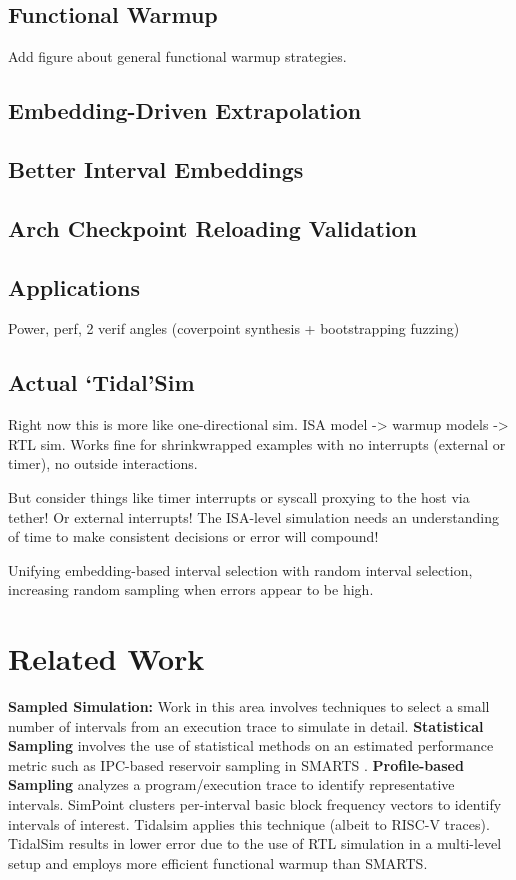 \documentclass[sigplan,nonacm,10pt]{acmart}
\begin{document}
\subsection{Functional Warmup}

Add figure about general functional warmup strategies.

\subsection{Embedding-Driven Extrapolation}

\subsection{Better Interval Embeddings}

\subsection{Arch Checkpoint Reloading Validation}

\subsection{Applications}

Power, perf, 2 verif angles (coverpoint synthesis + bootstrapping fuzzing)

\subsection{Actual `Tidal'Sim}

Right now this is more like one-directional sim. ISA model -> warmup models -> RTL sim.
Works fine for shrinkwrapped examples with no interrupts (external or timer), no outside interactions.

But consider things like timer interrupts or syscall proxying to the host via tether! Or external interrupts!
The ISA-level simulation needs an understanding of time to make consistent decisions or error will compound!

Unifying embedding-based interval selection with random interval selection, increasing random sampling when errors appear to be high.

\section{Related Work}

\textbf{Sampled Simulation:} Work in this area involves techniques to select a small number of intervals from an execution trace to simulate in detail. 
\textbf{Statistical Sampling} involves the use of statistical methods on an estimated performance metric such as IPC-based reservoir sampling in SMARTS \cite{smarts}.
\textbf{Profile-based Sampling} analyzes a program/execution trace to identify representative intervals. SimPoint \cite{simpoint3} clusters per-interval basic block frequency vectors to identify intervals of interest. Tidalsim applies this technique (albeit to RISC-V traces). 
TidalSim results in lower error due to the use of RTL simulation in a multi-level setup and employs more efficient functional warmup than SMARTS.
\end{document}
